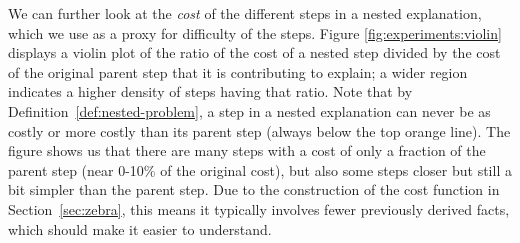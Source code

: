We can further look at the \textit{cost} of the different steps in a nested explanation, which we use as a proxy for difficulty of the steps. 
Figure \ref{fig:experiments:violin} displays a violin plot of the ratio of the cost of a nested step divided by the cost of the original parent step that it is contributing to explain; a wider region indicates a higher density of steps having that ratio. 
Note that by Definition~\ref{def:nested-problem}, a step in a nested explanation can never be as costly or more costly than its parent step (always below the top orange line).
The figure shows us that there are many steps with a cost of only a fraction of the parent step (near 0-10\% of the original cost), but also some steps closer but still a bit simpler than the parent step. 
Due to the construction of the cost function in Section~\ref{sec:zebra}, this means it typically involves fewer previously derived facts, which should make it easier to understand. 



